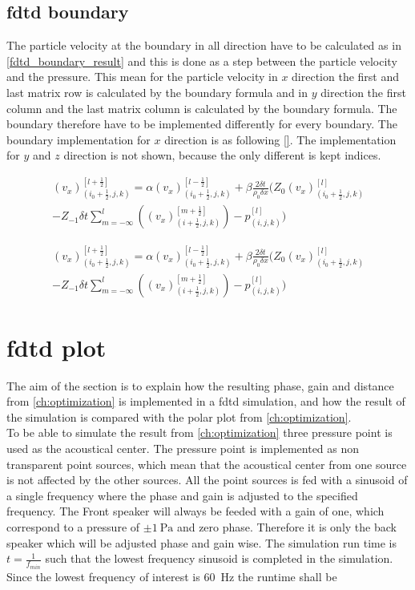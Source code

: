 \subsection{\gls{fdtd} boundary}
The particle velocity at the boundary in all direction have to be calculated as in \autoref{fdtd_boundary_result} and this is done as a step between the particle velocity and the pressure. This mean for the particle velocity in $x$ direction the first and last matrix row is calculated by the boundary formula and in $y$ direction the first column and the last matrix column is calculated by the boundary formula. The boundary therefore have to be implemented differently for every boundary. The boundary implementation for $x$ direction is as following \autoref{}. The implementation for $y$ and $z$ direction is not shown, because the only different is kept indices. 

\begin{multline}\label{fdtd_boundary_x1}
(v_x)_{(i_0+\frac{1}{2},j,k)}^{[l+\frac{1}{2}]}= \alpha (v_x)_{(i_0+\frac{1}{2},j,k)}^{[l-\frac{1}{2}]} + \beta \frac{2 \delta t}{\rho_0 \delta x} \Biggl( 
 Z_0(v_x)_{(i_0+\frac{1}{2},j,k)}^{[l]} \\
-Z_{-1} \delta t \sum_{m=-\infty}^{l} \left( (v_x)_{(i+\frac{1}{2},j,k)}^{[m+\frac{1}{2}]} \right) -p_{(i,j,k)}^{[l]}
\Biggr)
\end{multline}

\begin{multline}\label{fdtd_boundary_x2}
(v_x)_{(i_0+\frac{1}{2},j,k)}^{[l+\frac{1}{2}]}= \alpha (v_x)_{(i_0+\frac{1}{2},j,k)}^{[l-\frac{1}{2}]} + \beta \frac{2 \delta t}{\rho_0 \delta x} \Biggl( 
 Z_0(v_x)_{(i_0+\frac{1}{2},j,k)}^{[l]} \\
-Z_{-1} \delta t \sum_{m=-\infty}^{l} \left( (v_x)_{(i+\frac{1}{2},j,k)}^{[m+\frac{1}{2}]} \right) -p_{(i,j,k)}^{[l]}
\Biggr)
\end{multline}

\section{\gls{fdtd} plot}
The aim of the section is to explain how the resulting phase, gain and distance from \autoref{ch:optimization} is implemented in a \gls{fdtd} simulation, and how the result of the simulation is compared with the polar plot from \autoref{ch:optimization}. \\

To be able to simulate the result from \autoref{ch:optimization} three pressure point is used as the acoustical center. The pressure point is implemented as non transparent point sources, which mean that the acoustical center from one source is not affected by the other sources. All the point sources is fed with a sinusoid of a single frequency where the phase and gain is adjusted to the specified frequency. The Front speaker will always be feeded with a gain of one, which correspond to a pressure of $\pm \SI{1}{\pascal}$ and zero phase. Therefore it is only the back speaker which will be adjusted phase and gain wise. The simulation run time is $t=\frac{1}{f_{min}}$ such that the lowest frequency sinusoid is completed in the simulation. Since the lowest frequency of interest is \SI{60}{\hertz} the runtime shall be 

